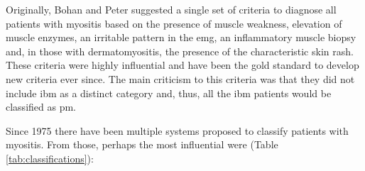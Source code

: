 Originally, Bohan and Peter suggested a single set of criteria to diagnose all patients with myositis based on the presence of muscle weakness, elevation of muscle enzymes, an irritable pattern in the \gls{emg}, an inflammatory muscle biopsy and, in those with dermatomyositis, the presence of the characteristic skin rash.\cite{Bohan1975} These criteria were highly influential and have been the gold standard to develop new criteria ever since. The main criticism to this criteria was that they did not include \gls{ibm} as a distinct category and, thus, all the \gls{ibm} patients would be classified as \gls{pm}.

Since 1975 there have been multiple systems proposed to classify patients with myositis. From those, perhaps the most influential were (Table \ref{tab:classifications}):

